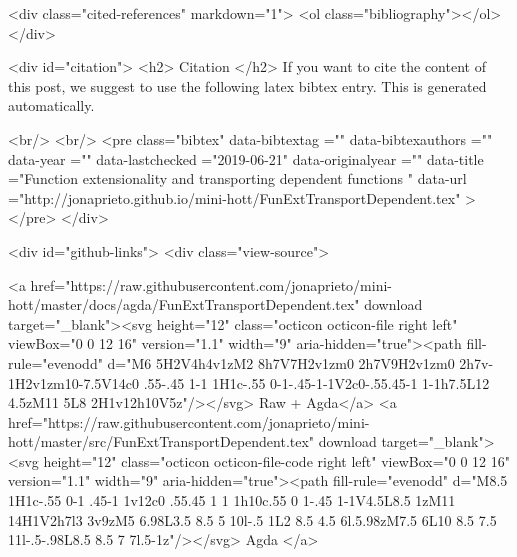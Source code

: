   <div class="cited-references" markdown="1">
  <ol class="bibliography"></ol>
  </div>


  
  <div id="citation">
  <h2> Citation </h2>
  If you want to cite the content of this post,
  we suggest to use the following latex bibtex entry.
  This is generated automatically.

  <br/>
  <br/>
  <pre class="bibtex"
       data-bibtextag =""
       data-bibtexauthors =""
       data-year =""
       data-lastchecked ="2019-06-21"
       data-originalyear =""
       data-title ="Function extensionality and transporting dependent functions "
       data-url ="http://jonaprieto.github.io/mini-hott/FunExtTransportDependent.tex"
  ></pre>
  </div>
  

  <div id="github-links">
    <div class="view-source">
      
        <a href="https://raw.githubusercontent.com/jonaprieto/mini-hott/master/docs/agda/FunExtTransportDependent.tex" download target="_blank"><svg height="12" class="octicon octicon-file right left" viewBox="0 0 12 16" version="1.1" width="9" aria-hidden="true"><path fill-rule="evenodd" d="M6 5H2V4h4v1zM2 8h7V7H2v1zm0 2h7V9H2v1zm0 2h7v-1H2v1zm10-7.5V14c0 .55-.45 1-1 1H1c-.55 0-1-.45-1-1V2c0-.55.45-1 1-1h7.5L12 4.5zM11 5L8 2H1v12h10V5z"/></svg> Raw + Agda</a>
        <a href="https://raw.githubusercontent.com/jonaprieto/mini-hott/master/src/FunExtTransportDependent.tex" download target="_blank"><svg height="12" class="octicon octicon-file-code right left" viewBox="0 0 12 16" version="1.1" width="9" aria-hidden="true"><path fill-rule="evenodd" d="M8.5 1H1c-.55 0-1 .45-1 1v12c0 .55.45 1 1 1h10c.55 0 1-.45 1-1V4.5L8.5 1zM11 14H1V2h7l3 3v9zM5 6.98L3.5 8.5 5 10l-.5 1L2 8.5 4.5 6l.5.98zM7.5 6L10 8.5 7.5 11l-.5-.98L8.5 8.5 7 7l.5-1z"/></svg> Agda </a>
      
